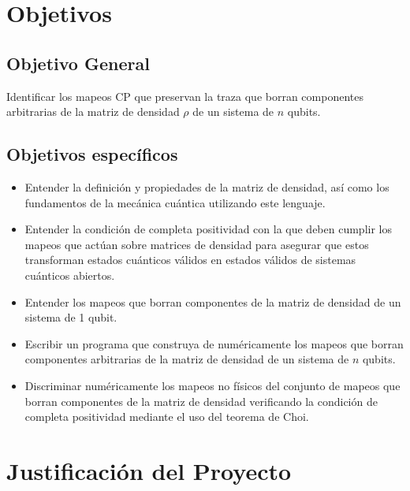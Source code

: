 \documentclass[11pt, spanish, letterpage]{article} %
\begin{document}
\section{Objetivos} %
\subsection{Objetivo General}
Identificar los mapeos CP  que preservan la traza que borran
componentes arbitrarias de la matriz de densidad $\rho$ de un sistema de $n$
qubits. 	

\subsection{Objetivos específicos}
\begin{itemize}
\item Entender la definición y propiedades de la matriz de densidad, así como
	  los fundamentos de la mecánica cuántica utilizando este lenguaje.
\item Entender la condición de completa positividad con la que deben cumplir 
	  los mapeos que actúan sobre matrices de densidad para asegurar que estos 
	  transforman estados cuánticos válidos en estados válidos de sistemas 
	  cuánticos abiertos.
\item Entender los mapeos que borran componentes de la matriz de densidad
	  de un sistema de 1 qubit.
\item Escribir un programa que construya de numéricamente los mapeos que
	  borran componentes arbitrarias de la matriz de densidad de un sistema 
	  de $n$ qubits.
\item Discriminar numéricamente los mapeos no físicos del conjunto de mapeos
	  que borran componentes de la matriz de densidad verificando 
	  la condición de completa positividad mediante el uso del teorema de Choi.
\end{itemize}

\section{Justificación del Proyecto}%
\end{document}
